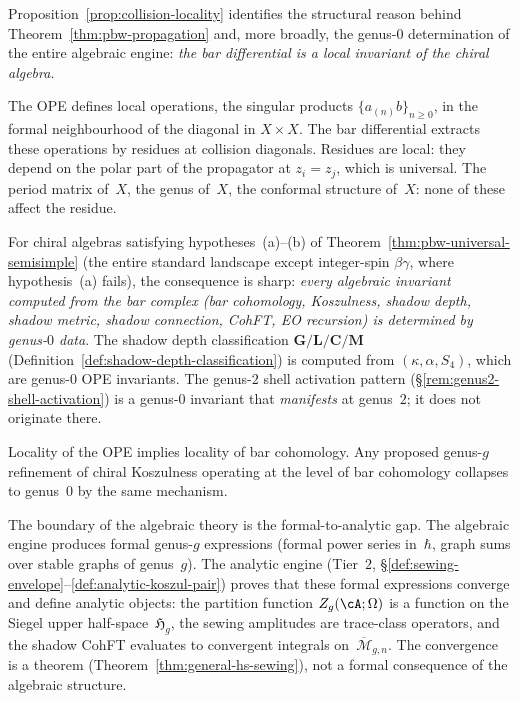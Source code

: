 \begin{remark}
\label{rem:locality-boundary}

Proposition~\ref{prop:collision-locality} identifies
the structural reason behind
Theorem~\ref{thm:pbw-propagation}
and, more broadly, the genus-$0$ determination of the
entire algebraic engine:
\emph{the bar differential is a local invariant
of the chiral algebra}.

The OPE defines local operations, the singular
products $\{a_{(n)}b\}_{n \geq 0}$, in the formal
neighbourhood of the diagonal in $X \times X$.
The bar differential extracts these operations by
residues at collision diagonals.  Residues are
local: they depend on the polar part of the propagator
at $z_i = z_j$, which is universal.  The period
matrix of~$X$, the genus of~$X$, the conformal
structure of~$X$: none of these affect the residue.

For chiral algebras satisfying
hypotheses~\textup{(a)--(b)} of
Theorem~\textup{\ref{thm:pbw-universal-semisimple}}
\textup{(}the entire standard landscape except integer-spin $\beta\gamma$, where hypothesis~\textup{(a)} fails\textup{)},
the consequence is sharp: \emph{every algebraic
invariant computed from the bar complex (bar
cohomology, Koszulness, shadow depth, shadow metric,
shadow connection, CohFT, EO recursion) is determined
by genus-$0$ data}.  The shadow depth classification
$\mathbf{G}/\mathbf{L}/\mathbf{C}/\mathbf{M}$
(Definition~\ref{def:shadow-depth-classification})
is computed from $(\kappa, \alpha, S_4)$, which are
genus-$0$ OPE invariants.  The genus-$2$ shell
activation pattern
(\S\ref{rem:genus2-shell-activation}) is a genus-$0$
invariant that \emph{manifests} at genus~$2$; it does
not originate there.

Locality of the OPE implies locality of bar
cohomology.  Any proposed genus-$g$ refinement
of chiral Koszulness operating at the level of
bar cohomology collapses to genus~$0$ by the
same mechanism.

The boundary of the algebraic theory is the
formal-to-analytic gap.  The algebraic engine
produces formal genus-$g$ expressions
(formal power series in~$\hbar$,
graph sums over stable graphs of genus~$g$).
The analytic engine
(Tier~$2$, \S\ref{def:sewing-envelope}--\ref{def:analytic-koszul-pair})
proves that these formal expressions converge and
define analytic objects: the partition function
$Z_g(\cA;\Omega)$ is a function on the Siegel
upper half-space~$\mathfrak{H}_g$,
the sewing amplitudes are trace-class operators,
and the shadow CohFT evaluates to convergent integrals
on~$\overline{\mathcal{M}}_{g,n}$.
The convergence is a theorem
(Theorem~\ref{thm:general-hs-sewing}),
not a formal consequence of the algebraic structure.


\end{remark}
